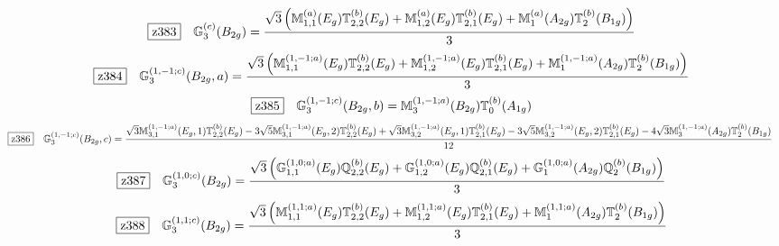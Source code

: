 \documentclass[fleqn,10pt,landscape]{jsarticle}
\begin{document}
\begin{dmath*}
\hspace*{3mm}\fbox{z383}\quad \mathbb{G}_{3}^{(c)}(B_{2g})=\frac{\sqrt{3} \left(\mathbb{M}_{1,1}^{(a)}(E_{g}) \mathbb{T}_{2,2}^{(b)}(E_{g}) + \mathbb{M}_{1,2}^{(a)}(E_{g}) \mathbb{T}_{2,1}^{(b)}(E_{g}) + \mathbb{M}_{1}^{(a)}(A_{2g}) \mathbb{T}_{2}^{(b)}(B_{1g})\right)}{3}
\end{dmath*}
\begin{dmath*}
\hspace*{3mm}\fbox{z384}\quad \mathbb{G}_{3}^{(1,-1;c)}(B_{2g},a)=\frac{\sqrt{3} \left(\mathbb{M}_{1,1}^{(1,-1;a)}(E_{g}) \mathbb{T}_{2,2}^{(b)}(E_{g}) + \mathbb{M}_{1,2}^{(1,-1;a)}(E_{g}) \mathbb{T}_{2,1}^{(b)}(E_{g}) + \mathbb{M}_{1}^{(1,-1;a)}(A_{2g}) \mathbb{T}_{2}^{(b)}(B_{1g})\right)}{3}
\end{dmath*}
\begin{dmath*}
\hspace*{3mm}\fbox{z385}\quad \mathbb{G}_{3}^{(1,-1;c)}(B_{2g},b)=\mathbb{M}_{3}^{(1,-1;a)}(B_{2g}) \mathbb{T}_{0}^{(b)}(A_{1g})
\end{dmath*}
\begin{dmath*}
\hspace*{3mm}\fbox{z386}\quad \mathbb{G}_{3}^{(1,-1;c)}(B_{2g},c)=\frac{\sqrt{3} \mathbb{M}_{3,1}^{(1,-1;a)}(E_{g},1) \mathbb{T}_{2,2}^{(b)}(E_{g}) - 3 \sqrt{5} \mathbb{M}_{3,1}^{(1,-1;a)}(E_{g},2) \mathbb{T}_{2,2}^{(b)}(E_{g}) + \sqrt{3} \mathbb{M}_{3,2}^{(1,-1;a)}(E_{g},1) \mathbb{T}_{2,1}^{(b)}(E_{g}) - 3 \sqrt{5} \mathbb{M}_{3,2}^{(1,-1;a)}(E_{g},2) \mathbb{T}_{2,1}^{(b)}(E_{g}) - 4 \sqrt{3} \mathbb{M}_{3}^{(1,-1;a)}(A_{2g}) \mathbb{T}_{2}^{(b)}(B_{1g})}{12}
\end{dmath*}
\begin{dmath*}
\hspace*{3mm}\fbox{z387}\quad \mathbb{G}_{3}^{(1,0;c)}(B_{2g})=\frac{\sqrt{3} \left(\mathbb{G}_{1,1}^{(1,0;a)}(E_{g}) \mathbb{Q}_{2,2}^{(b)}(E_{g}) + \mathbb{G}_{1,2}^{(1,0;a)}(E_{g}) \mathbb{Q}_{2,1}^{(b)}(E_{g}) + \mathbb{G}_{1}^{(1,0;a)}(A_{2g}) \mathbb{Q}_{2}^{(b)}(B_{1g})\right)}{3}
\end{dmath*}
\begin{dmath*}
\hspace*{3mm}\fbox{z388}\quad \mathbb{G}_{3}^{(1,1;c)}(B_{2g})=\frac{\sqrt{3} \left(\mathbb{M}_{1,1}^{(1,1;a)}(E_{g}) \mathbb{T}_{2,2}^{(b)}(E_{g}) + \mathbb{M}_{1,2}^{(1,1;a)}(E_{g}) \mathbb{T}_{2,1}^{(b)}(E_{g}) + \mathbb{M}_{1}^{(1,1;a)}(A_{2g}) \mathbb{T}_{2}^{(b)}(B_{1g})\right)}{3}
\end{dmath*}
\end{document}
